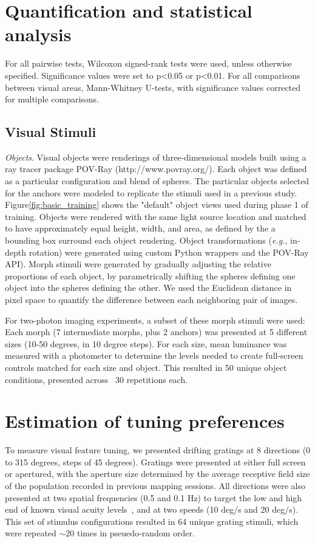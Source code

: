 \section{Quantification and statistical analysis}
For all pairwise tests, Wilcoxon signed-rank tests were used, unless otherwise specified. Significance values were set to p<0.05 or p<0.01. For all comparisons between visual areas, Mann-Whitney U-tests, with significance values corrected for multiple comparisons.

\subsection{Visual Stimuli}
\textit{Objects}. Visual objects were renderings of three-dimensional models built using a ray tracer package POV-Ray (http://www.povray.org/). Each object was defined as a particular configuration and blend of spheres. The particular objects selected for the anchors were modeled to replicate the stimuli used in a previous study\cite{Zoccolan2009}. Figure\ref{fig:basic_training} shows the "default" object views used during phase 1 of training. Objects were rendered with the same light source location and matched to have approximately equal height, width, and area, as defined by the a bounding box surround each object rendering. Object transformations (\textit{e.g.}, in-depth rotation) were generated using custom Python wrappers and the POV-Ray API). Morph stimuli were generated by gradually adjusting the relative proportions of each object, by parametrically shifting the spheres defining one object into the spheres defining the other. We used the Euclidean distance in pixel space to quantify the difference between each neighboring pair of images. 

For two-photon imaging experiments, a subset of these morph stimuli were used: Each morph (7 intermediate morphs, plus 2 anchors) was presented at 5 different sizes (10-50 degrees, in 10 degree steps). For each size, mean luminance was measured with a photometer to determine the levels needed to create full-screen controls matched for each size and object. This resulted in 50 unique object conditions, presented across ~30 repetitions each.

\section{Estimation of tuning preferences}
To measure visual feature tuning, we presented drifting gratings at 8 directions (0 to 315 degrees, steps of 45 degrees). Gratings were presented at either full screen or apertured, with the aperture size determined by the average receptive field size of the population recorded in previous  mapping sessions.  All directions were also presented at two spatial frequencies (0.5 and 0.1 Hz) to target the low and high end of known visual acuity levels~\cite{Prusky2000}, and at two speeds (10 deg/s and 20 deg/s). This set of stimulus configurations resulted in 64 unique grating stimuli, which were repeated $\sim$20 times in pseuedo-random order.

